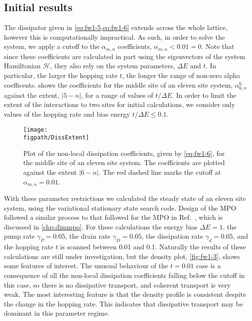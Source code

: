 \subsection{Initial results}
The dissipator given in \cref{eq:fw1-5,eq:fw1-6} extends across the whole lattice, however this is computationally impractical. As such, in order to solve the system, we apply a cutoff to the \(\alpha_{m,n}\) coefficients, \(\alpha_{m,n} < 0.01 = 0\). Note that since these coefficients are calculated in part using the eigenvectors of the system Hamiltonian \(\mathcal{H}\), they also rely on the system parameters, \(\Delta E\) and \(t\). In particular, the larger the hopping rate \(t\), the longer the range of non-zero alpha coefficents.  shows the coefficients for the middle site of an eleven site system, \(\alpha_{6,n}^{6}\) against the extent, \(|5-n|\), for a range of values of \( t / \Delta E\). In order to limit the extent of the interactions to two sites for initial calculations, we consider only values of the hopping rate and bias energy \(t / \Delta E \leq 0.1\). 

\begin{figure}[ht!]
	\centering
	\texttt{[image: \\figpath/DissExtent]}
	\caption{\label{fig:fw1-2}Plot of the non-local dissipation coefficients, given by \cref{eq:fw1-6}, for the middle site of an eleven site system. The coefficients are plotted against the extent \(|6-n|\). The red dashed line marks the cutoff at \(\alpha_{m,n} = 0.01\).}
\end{figure}

With these parameter restrictions we calculated the steady state of an eleven site system, using the variational stationary state search code. Design of the MPO followed a similar process to that followed for the MPO in Ref.~\cite{Owen2017}, which is discussed in \cref{chp:dimmpo}. For these calculations the energy bias \(\Delta E = 1\), the pump rate \(\gamma_{P} = 0.05\), the drain rate \(\gamma_{D} = 0.05\), the dissipation rate \(\gamma_{d} = 0.05\), and the hopping rate \(t\) is scanned between 0.01 and 0.1. Naturally the results of these calculations are still under investigation, but the density plot, \cref{fig:fw1-3}, shows some features of interest. The unusual behaviour of the \(t=0.01\) case is a consequence of all the non-local dissipation coefficients falling below the cutoff in this case, so there is no dissipative transport, and coherent transport is very weak. The most interesting feature is that the density profile is consistent despite the change in the hopping rate. This indicates that dissipative transport may be dominant in this parameter regime.
 
